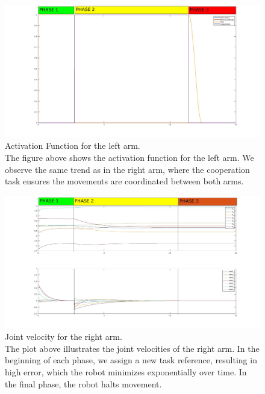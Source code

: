 \documentclass{article}
\begin{document}
\begin{figure}[h]
    \centering
    \includegraphics[width=1\textwidth]{imgs/ex3/activation left.jpg}
    \caption{Activation Function for the left arm.\\
	The figure above shows the activation function for the left arm. We observe the same trend as in the right arm, where the cooperation task ensures the movements are coordinated between both arms.
}
\end{figure}

\begin{figure}[h]
    \centering
    \includegraphics[width=1\textwidth]{imgs/ex3/joint velocity right neither.jpg}
    \caption{Joint velocity for the right arm.\\
	The plot above illustrates the joint velocities of the right arm. In the beginning of each phase, we assign a new task reference, resulting in high error, which the robot minimizes exponentially over time. In the final phase, the robot halts movement.
}
\end{figure}
\end{document}
